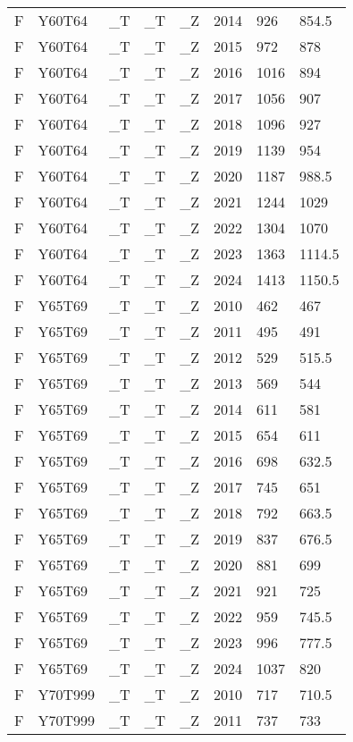 \begin{longtable}[t]{llllllll}
F & Y60T64 & \_T & \_T & \_Z & 2014 & 926 & 854.5\\
\addlinespace
F & Y60T64 & \_T & \_T & \_Z & 2015 & 972 & 878\\
F & Y60T64 & \_T & \_T & \_Z & 2016 & 1016 & 894\\
F & Y60T64 & \_T & \_T & \_Z & 2017 & 1056 & 907\\
F & Y60T64 & \_T & \_T & \_Z & 2018 & 1096 & 927\\
F & Y60T64 & \_T & \_T & \_Z & 2019 & 1139 & 954\\
\addlinespace
F & Y60T64 & \_T & \_T & \_Z & 2020 & 1187 & 988.5\\
F & Y60T64 & \_T & \_T & \_Z & 2021 & 1244 & 1029\\
F & Y60T64 & \_T & \_T & \_Z & 2022 & 1304 & 1070\\
F & Y60T64 & \_T & \_T & \_Z & 2023 & 1363 & 1114.5\\
F & Y60T64 & \_T & \_T & \_Z & 2024 & 1413 & 1150.5\\
\addlinespace
F & Y65T69 & \_T & \_T & \_Z & 2010 & 462 & 467\\
F & Y65T69 & \_T & \_T & \_Z & 2011 & 495 & 491\\
F & Y65T69 & \_T & \_T & \_Z & 2012 & 529 & 515.5\\
F & Y65T69 & \_T & \_T & \_Z & 2013 & 569 & 544\\
F & Y65T69 & \_T & \_T & \_Z & 2014 & 611 & 581\\
\addlinespace
F & Y65T69 & \_T & \_T & \_Z & 2015 & 654 & 611\\
F & Y65T69 & \_T & \_T & \_Z & 2016 & 698 & 632.5\\
F & Y65T69 & \_T & \_T & \_Z & 2017 & 745 & 651\\
F & Y65T69 & \_T & \_T & \_Z & 2018 & 792 & 663.5\\
F & Y65T69 & \_T & \_T & \_Z & 2019 & 837 & 676.5\\
\addlinespace
F & Y65T69 & \_T & \_T & \_Z & 2020 & 881 & 699\\
F & Y65T69 & \_T & \_T & \_Z & 2021 & 921 & 725\\
F & Y65T69 & \_T & \_T & \_Z & 2022 & 959 & 745.5\\
F & Y65T69 & \_T & \_T & \_Z & 2023 & 996 & 777.5\\
F & Y65T69 & \_T & \_T & \_Z & 2024 & 1037 & 820\\
\addlinespace
F & Y70T999 & \_T & \_T & \_Z & 2010 & 717 & 710.5\\
F & Y70T999 & \_T & \_T & \_Z & 2011 & 737 & 733\\

\end{longtable}
